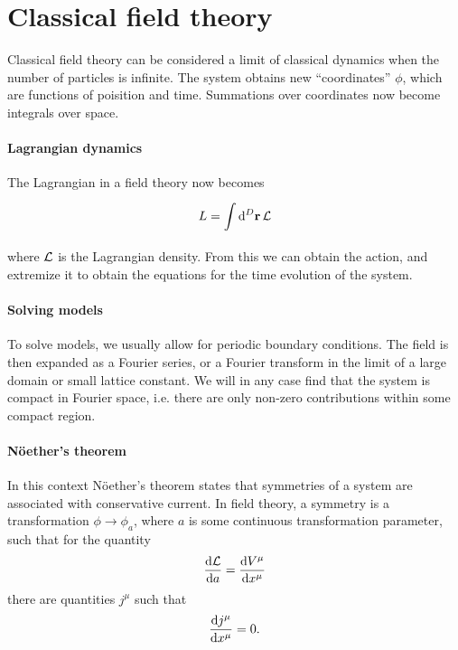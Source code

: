 \section{Classical field theory}

Classical field theory can be considered a limit of classical dynamics when the number of particles is infinite. The system obtains new ``coordinates'' $\phi$, which are functions of poisition and time. Summations over coordinates now become integrals over space.

\paragraph{Lagrangian dynamics}
The Lagrangian in a field theory now becomes
\begin{align*}
	L = \int\limits_{}^{}\dd[D]{\vb{r}}\mathcal{L}
\end{align*}
where $\mathcal{L}$ is the Lagrangian density. From this we can obtain the action, and extremize it to obtain the equations for the time evolution of the system.

\paragraph{Solving models}
To solve models, we usually allow for periodic boundary conditions. The field is then expanded as a Fourier series, or a Fourier transform in the limit of a large domain or small lattice constant. We will in any case find that the system is compact in Fourier space, i.e. there are only non-zero contributions within some compact region.

\paragraph{Nöether's theorem}
In this context Nöether's theorem states that symmetries of a system are associated with conservative current. In field theory, a symmetry is a transformation $\phi\to\phi_{a}$, where $a$ is some continuous transformation parameter, such that for the quantity
\begin{align*}
	\dv{\mathcal{L}}{a} = \dv{V^{\mu}}{x^{\mu}}
\end{align*}
there are quantities $j^{\mu}$ such that
\begin{align*}
	\dv{j^{\mu}}{x^{\mu}} = 0.
\end{align*}